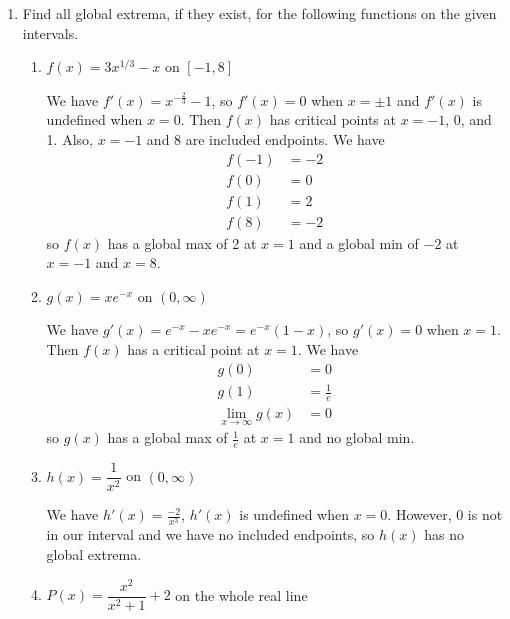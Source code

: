 \documentclass[11pt]{article}
\begin{document}
\drawtitle
\begin{enumerate}
\item Find all global extrema, if they exist, for the following
  functions on the given intervals.
  \begin{enumerate}
  \item $f(x)=3x^{1/3}-x$ on $[-1,8]$

    \vfill
    {\color{blue}
      
      We have $f'(x)=x^{-\frac{2}{3}}-1$, so $f'(x) = 0$ when $x=\pm
      1$ and $f'(x)$ is undefined when $x=0$.  Then $f(x)$ has
      critical points at $x=-1$, 0, and 1.  Also, $x=-1$ and 8 are
      included endpoints.  We have
      \begin{align*}
        f(-1) &= -2\\
        f(0) &= 0\\
        f(1) &= 2\\
        f(8) &= -2
      \end{align*}
      so $f(x)$ has a global max of 2 at $x=1$ and a global min of
      $-2$ at $x=-1$ and $x=8$.

    }
    \vfill
  
  \item $g(x)=xe^{-x}$ on $(0,\infty)$

    \vfill
    {\color{blue}
      
      We have $g'(x)=e^{-x}-xe^{-x}= e^{-x}(1-x)$, so $g'(x) = 0$ when
      $x=1$.  Then $f(x)$ has a critical point at $x=1$. We have
      \begin{align*}
        g(0) &= 0\\
        g(1) &= \frac{1}{e}\\
        \lim_{x\to\infty}g(x) &= 0
      \end{align*}
      so $g(x)$ has a global max of $\frac{1}{e}$ at $x=1$ and no
      global min.

    }
    \vfill
    
    \newpage

  \item $h(x)=\dfrac{1}{x^2}$ on $(0,\infty)$
    \vfill
    {\color{blue}
      
      We have $h'(x)=\frac{-2}{x^3}$, $h'(x)$ is undefined when $x=0$.
      However, 0 is not in our interval and we have no included
      endpoints, so $h(x)$ has no global extrema.

    }
    \vfill

  \item $P(x)=\dfrac{x^2}{x^2+1}+2$ on the whole real line
    \vfill
    {\color{blue}

}
\end{enumerate}
\end{enumerate}
\end{document}
